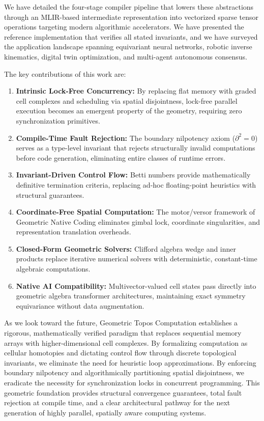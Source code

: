 \documentclass[manuscript, nonacm, review=false]{acmart}
\theoremstyle{definition}
\theoremstyle{plain}
\begin{document}
We have detailed the four-stage compiler pipeline that lowers these abstractions through an MLIR-based intermediate representation into vectorized sparse tensor operations targeting modern algorithmic accelerators. We have presented the reference implementation that verifies all stated invariants, and we have surveyed the application landscape spanning equivariant neural networks, robotic inverse kinematics, digital twin optimization, and multi-agent autonomous consensus.

The key contributions of this work are:

\begin{enumerate}[label=(\roman*)]
    \item \textbf{Intrinsic Lock-Free Concurrency:} By replacing flat memory with graded cell complexes and scheduling via spatial disjointness, lock-free parallel execution becomes an emergent property of the geometry, requiring zero synchronization primitives.
    
    \item \textbf{Compile-Time Fault Rejection:} The boundary nilpotency axiom ($\partial^2 = 0$) serves as a type-level invariant that rejects structurally invalid computations before code generation, eliminating entire classes of runtime errors.
    
    \item \textbf{Invariant-Driven Control Flow:} Betti numbers provide mathematically definitive termination criteria, replacing ad-hoc floating-point heuristics with structural guarantees.
    
    \item \textbf{Coordinate-Free Spatial Computation:} The motor/versor framework of Geometric Native Coding eliminates gimbal lock, coordinate singularities, and representation translation overheads.
    
    \item \textbf{Closed-Form Geometric Solvers:} Clifford algebra wedge and inner products replace iterative numerical solvers with deterministic, constant-time algebraic computations.
    
    \item \textbf{Native AI Compatibility:} Multivector-valued cell states pass directly into geometric algebra transformer architectures, maintaining exact symmetry equivariance without data augmentation.
\end{enumerate}

As we look toward the future, Geometric Topos Computation establishes a rigorous, mathematically verified paradigm that replaces sequential memory arrays with higher-dimensional cell complexes. By formalizing computation as cellular homotopies and dictating control flow through discrete topological invariants, we eliminate the need for heuristic loop approximations. By enforcing boundary nilpotency and algorithmically partitioning spatial disjointness, we eradicate the necessity for synchronization locks in concurrent programming. This geometric foundation provides structural convergence guarantees, total fault rejection at compile time, and a clear architectural pathway for the next generation of highly parallel, spatially aware computing systems.
\end{document}

